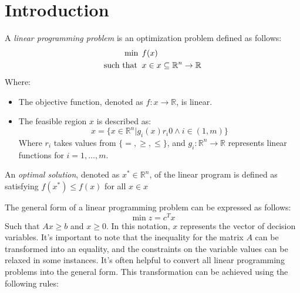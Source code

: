 \section{Introduction}

\begin{definition}
    A \emph{linear programming problem} is an optimization problem defined as follows:
    \begin{align*}
        \min                      \:&\:f(x)           \\
        \textnormal{such that }     &\: x \in x \subseteq \mathbb{R}^n \rightarrow \mathbb{R} 
    \end{align*}
    Where: 
    \begin{itemize}
        \item The objective function, denoted as $f:x \rightarrow \mathbb{R}$, is linear. 
        \item The feasible region $x$ is described as:
            \[x=\{x\in\mathbb{R}^n|g_i(x)r_i0\land i\in(1,m)\}\]
            Where $r_i$ takes values from $\{=,\geq,\leq\}$, and $g_i:\mathbb{R}^n\rightarrow\mathbb{R}$ represents linear functions for $i=1,\dots,m$.
    \end{itemize}

    An \emph{optimal solution}, denoted as $x^{*} \in \mathbb{R}^n$, of the linear program is defined as satisfying $f(x^{*}) \leq f(x)$ for all $x\in x$
\end{definition}
The general form of a linear programming problem can be expressed as follows:
\[\min{z}=c^Tx\]
Such that $Ax \geq b$ and $x \geq 0$. 
In this notation, $x$ represents the vector of decision variables.
It's important to note that the inequality for the matrix $A$ can be transformed into an equality, and the constraints on the variable values can be relaxed in some instances.
It's often helpful to convert all linear programming problems into the general form.
This transformation can be achieved using the following rules:
